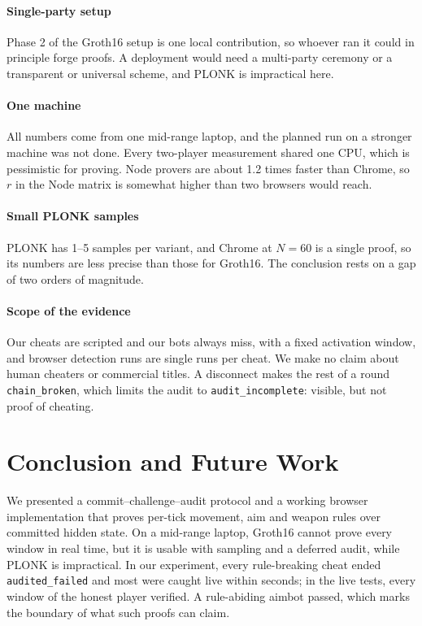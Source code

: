 \documentclass[conference]{IEEEtran}
\newcommand{\status}[1]{\texttt{#1}}
\begin{document}
\paragraph*{Single-party setup}
Phase 2 of the Groth16 setup is one local contribution, so whoever ran it could in principle forge proofs. %
A deployment would need a multi-party ceremony or a transparent or universal scheme, and PLONK is impractical here.

\paragraph*{One machine}
All numbers come from one mid-range laptop, and the planned run on a stronger machine was not done. %
Every two-player measurement shared one CPU, which is pessimistic for proving. %
Node provers are about 1.2 times faster than Chrome, so $r$ in the Node matrix is somewhat higher than two browsers would reach. %

\paragraph*{Small PLONK samples}
PLONK has 1--5 samples per variant, and Chrome at $N=60$ is a single proof, so its numbers are less precise than those for Groth16. %
The conclusion rests on a gap of two orders of magnitude. %

\paragraph*{Scope of the evidence}
Our cheats are scripted and our bots always miss, with a fixed activation window, and browser detection runs are single runs per cheat. %
We make no claim about human cheaters or commercial titles.
A disconnect makes the rest of a round \status{chain\_broken}, which limits the audit to \status{audit\_incomplete}: visible, but not proof of cheating.

\section{Conclusion and Future Work}

We presented a commit--challenge--audit protocol and a working browser implementation that proves per-tick movement, aim and weapon rules over committed hidden state.
On a mid-range laptop, Groth16 cannot prove every window in real time, but it is usable with sampling and a deferred audit, while PLONK is impractical.
In our experiment, every rule-breaking cheat ended \status{audited\_failed} and most were caught live within seconds; in the live tests, every window of the honest player verified.
A rule-abiding aimbot passed, which marks the boundary of what such proofs can claim.
\end{document}
